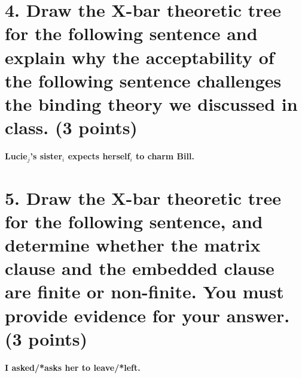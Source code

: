 \documentclass{article}
\begin{document}
\section{4. Draw the X-bar theoretic tree for the following sentence and explain why the acceptability of the following sentence challenges the binding theory we discussed in class. \normalsize{(3 points)}}
\medskip
\begin{center}
     \textbf{Lucie$_j$'s sister$_i$ expects herself$_i$ to charm Bill.}
\end{center}

\newpage
\section{5. Draw the X-bar theoretic tree for the following sentence, and determine whether the matrix clause and the embedded clause are finite or non-finite. You must provide evidence for your answer. \normalsize{(3 points)}}
\medskip
\begin{center} 
    \textbf{I asked/*asks her to leave/*left.}
\end{center}
\end{document}

